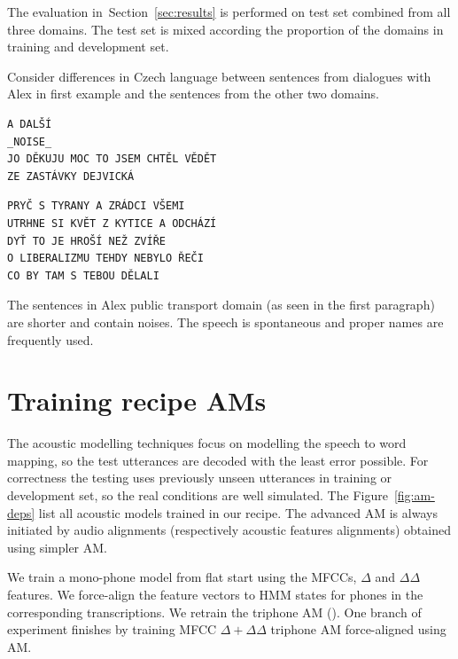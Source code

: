 The evaluation in~Section~\ref{sec:results} is performed  on test set combined from all three domains.
The test set is mixed according the proportion of the domains in training and development set.

Consider differences in Czech language between sentences from dialogues with Alex in first example and the sentences from the other two domains.

\begin{verbatim}
A DALŠÍ
_NOISE_
JO DĚKUJU MOC TO JSEM CHTĚL VĚDĚT
ZE ZASTÁVKY DEJVICKÁ
\end{verbatim}

\begin{verbatim}
PRYČ S TYRANY A ZRÁDCI VŠEMI
UTRHNE SI KVĚT Z KYTICE A ODCHÁZÍ
DYŤ TO JE HROŠÍ NEŽ ZVÍŘE
O LIBERALIZMU TEHDY NEBYLO ŘEČI
CO BY TAM S TEBOU DĚLALI
\end{verbatim}

The sentences in Alex public transport domain (as seen in the first paragraph) are shorter and contain noises.
The speech is spontaneous and proper names are frequently used.



\section{Training recipe \acp{AM}}
\label{sec:am_train}

The acoustic modelling techniques focus on modelling the speech to word mapping, so the test utterances are decoded with the least error possible. 
For correctness the testing uses previously unseen utterances in training or development set, so the real conditions are well simulated.
The Figure~\ref{fig:am-deps} list all acoustic models trained in our recipe.
The advanced \ac{AM} is always initiated by audio alignments (respectively acoustic features alignments) obtained using simpler \ac{AM}.

We train a mono-phone model from flat start using the MFCCs, $\Delta$ and $\Delta \Delta$ features.
We force-align the feature vectors to HMM states for phones in the corresponding transcriptions.
We retrain the triphone \ac{AM} ().
One branch of experiment finishes by training \ac{MFCC} $\Delta + \Delta\Delta$ triphone \ac{AM} force-aligned using  \ac{AM}.

